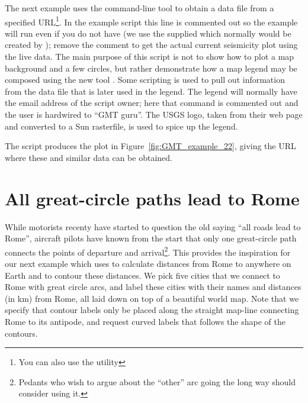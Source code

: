 The next example uses the command-line tool  to obtain a data file
from a specified URL\footnote{You can also use the utility }.
In the example script this line is commented out so the
example will run even if you do not have  (we use the supplied
 which normally would be created by ); remove the comment to
get the actual current seismicity plot using the live data.  The main purpose of
this script is not to show how to plot a map background and a few circles, but
rather demonstrate how a map legend may be composed using the new tool .
Some scripting is used to pull out information from the data file that is later
used in the legend.  The legend will normally have the email address of the script
owner; here that command is commented out and the user is hardwired to ``GMT guru''.
The USGS logo, taken from their web page and converted to a Sun rasterfile, is used
to spice up the legend.


The script produces the plot in Figure~\ref{fig:GMT_example_22}, giving the URL
where these and similar data can be obtained.


\section{All great-circle paths lead to Rome}

While motorists recenty have started to question the old saying ``all roads lead to Rome'',
aircraft pilots have known from the start that only one great-circle path connects the
points of departure and arrival\footnote{Pedants who wish to argue about the ``other''
arc going the long way should consider using it.}.  This provides the inspiration for our next
example which uses  to calculate distances from Rome to anywhere on
Earth and  to contour these distances.  We pick five cities that
we connect to Rome with great circle arcs, and label these cities with their names and
distances (in km) from Rome, all laid down on top of a beautiful world map.  Note that
we specify that contour labels only be placed along the straight map-line connecting
Rome to its antipode, and request curved labels that follows the shape of the contours.

